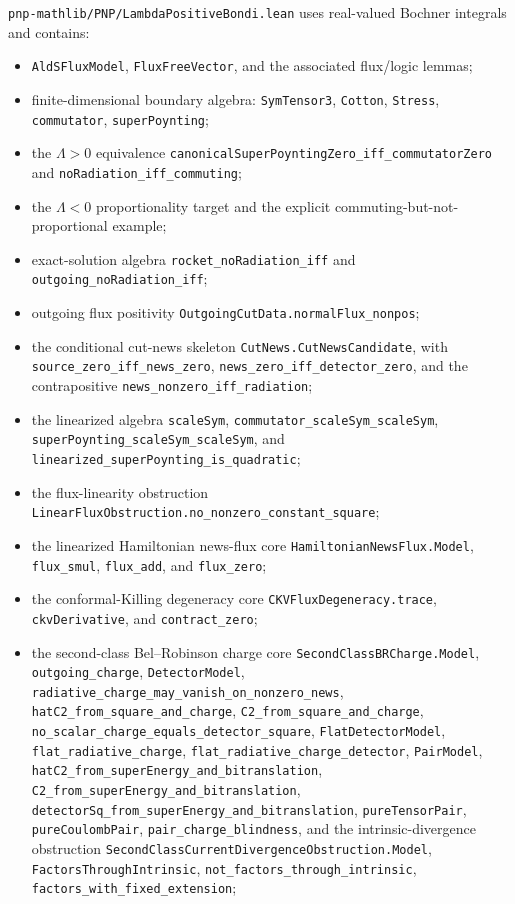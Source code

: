 \documentclass[11pt,a4paper]{article}
\begin{document}
\texttt{pnp-mathlib/PNP/LambdaPositiveBondi.lean} uses real-valued Bochner integrals and contains:
\begin{itemize}
  \item \texttt{AldSFluxModel}, \texttt{FluxFreeVector}, and the associated flux/logic lemmas;
  \item finite-dimensional boundary algebra: \texttt{SymTensor3}, \texttt{Cotton}, \texttt{Stress}, \texttt{commutator}, \texttt{superPoynting};
  \item the \(\Lambda>0\) equivalence \texttt{canonicalSuperPoyntingZero\_iff\_commutatorZero} and \texttt{noRadiation\_iff\_commuting};
  \item the \(\Lambda<0\) proportionality target and the explicit commuting-but-not-proportional example;
  \item exact-solution algebra \texttt{rocket\_noRadiation\_iff} and \texttt{outgoing\_noRadiation\_iff};
  \item outgoing flux positivity \texttt{OutgoingCutData.normalFlux\_nonpos};
  \item the conditional cut-news skeleton \texttt{CutNews.CutNewsCandidate}, with \texttt{source\_zero\_iff\_news\_zero}, \texttt{news\_zero\_iff\_detector\_zero}, and the contrapositive \texttt{news\_nonzero\_iff\_radiation};
  \item the linearized algebra \texttt{scaleSym}, \texttt{commutator\_scaleSym\_scaleSym}, \texttt{superPoynting\_scaleSym\_scaleSym}, and \texttt{linearized\_superPoynting\_is\_quadratic};
  \item the flux-linearity obstruction \texttt{LinearFluxObstruction.no\_nonzero\_constant\_square};
  \item the linearized Hamiltonian news-flux core \texttt{HamiltonianNewsFlux.Model}, \texttt{flux\_smul}, \texttt{flux\_add}, and \texttt{flux\_zero};
  \item the conformal-Killing degeneracy core \texttt{CKVFluxDegeneracy.trace}, \texttt{ckvDerivative}, and \texttt{contract\_zero};
  \item the second-class Bel--Robinson charge core \texttt{SecondClassBRCharge.Model}, \texttt{outgoing\_charge}, \texttt{DetectorModel}, \texttt{radiative\_charge\_may\_vanish\_on\_nonzero\_news}, \texttt{hatC2\_from\_square\_and\_charge}, \texttt{C2\_from\_square\_and\_charge}, \texttt{no\_scalar\_charge\_equals\_detector\_square}, \texttt{FlatDetectorModel}, \texttt{flat\_radiative\_charge}, \texttt{flat\_radiative\_charge\_detector}, \texttt{PairModel}, \texttt{hatC2\_from\_superEnergy\_and\_bitranslation}, \texttt{C2\_from\_superEnergy\_and\_bitranslation}, \texttt{detectorSq\_from\_superEnergy\_and\_bitranslation}, \texttt{pureTensorPair}, \texttt{pureCoulombPair}, \texttt{pair\_charge\_blindness}, and the intrinsic-divergence obstruction \texttt{SecondClassCurrentDivergenceObstruction.Model}, \texttt{FactorsThroughIntrinsic}, \texttt{not\_factors\_through\_intrinsic}, \texttt{factors\_with\_fixed\_extension};

\end{itemize}
\end{document}
